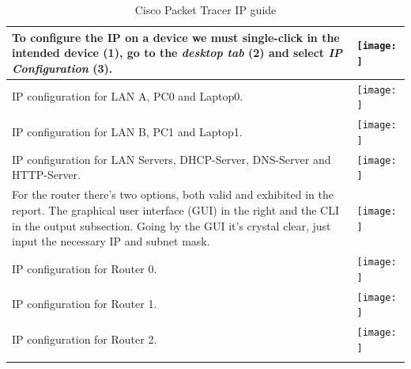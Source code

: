 \documentclass[11pt,a4paper]{report}
\begin{document}
\begin{flushleft}
\begin{center}
\begin{longtable}{ m{5cm} l }
                    To configure the IP on a device we must \textbf{single-click} in the intended device (1), go to the \textit{desktop tab} (2) and select \textit{IP Configuration} (3).                                                                                                              & \texttt{[image: ]} \\ \hline
                    IP configuration for LAN A, PC0 and Laptop0.                                                                                                                                                                                                                                        & \texttt{[image: ]} \\ \hline
                    IP configuration for LAN B, PC1 and Laptop1.                                                                                                                                                                                                                                        & \texttt{[image: ]} \\ \hline
                    IP configuration for LAN Servers, DHCP-Server, DNS-Server and HTTP-Server.                                                                                                                                                                                                          & \texttt{[image: ]} \\ \hline
                    For the router there's two options, both valid and exhibited in the report. The graphical user interface (GUI) in the right and the CLI in the output subsection. Going by the GUI it's crystal clear, just input the necessary IP and subnet mask.                                 & \texttt{[image: ]} \\ \hline
                    IP configuration for Router 0.                                                                                                                                                                                                                                                      & \texttt{[image: ]} \\ \hline
                    IP configuration for Router 1.                                                                                                                                                                                                                                                      & \texttt{[image: ]} \\ \hline
                    IP configuration for Router 2.                                                                                                                                                                                                                                                      & \texttt{[image: ]} \\ \hline
                    \caption{Cisco Packet Tracer IP guide}
                    \label{tab:cptg1}
                \end{longtable}
            \end{center}
    \end{flushleft}
\end{document}
